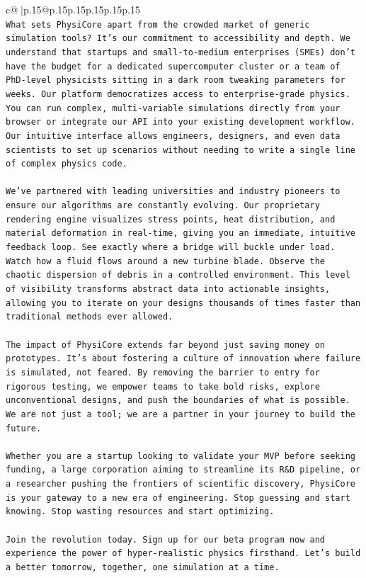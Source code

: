\documentclass{article}
\begin{document}
{\begin{supertabular}{c@{$\;$}|p{.15\linewidth}@{}p{.15\linewidth}p{.15\linewidth}p{.15\linewidth}p{.15\linewidth}p{.15\linewidth}}
{{{\\ 
\texttt{What sets PhysiCore apart from the crowded market of generic simulation tools? It's our commitment to accessibility and depth. We understand that startups and small{-}to{-}medium enterprises (SMEs) don't have the budget for a dedicated supercomputer cluster or a team of PhD{-}level physicists sitting in a dark room tweaking parameters for weeks. Our platform democratizes access to enterprise{-}grade physics. You can run complex, multi{-}variable simulations directly from your browser or integrate our API into your existing development workflow. Our intuitive interface allows engineers, designers, and even data scientists to set up scenarios without needing to write a single line of complex physics code.} \\
\\ 
\texttt{We've partnered with leading universities and industry pioneers to ensure our algorithms are constantly evolving. Our proprietary rendering engine visualizes stress points, heat distribution, and material deformation in real{-}time, giving you an immediate, intuitive feedback loop. See exactly where a bridge will buckle under load. Watch how a fluid flows around a new turbine blade. Observe the chaotic dispersion of debris in a controlled environment. This level of visibility transforms abstract data into actionable insights, allowing you to iterate on your designs thousands of times faster than traditional methods ever allowed.} \\
\\ 
\texttt{The impact of PhysiCore extends far beyond just saving money on prototypes. It's about fostering a culture of innovation where failure is simulated, not feared. By removing the barrier to entry for rigorous testing, we empower teams to take bold risks, explore unconventional designs, and push the boundaries of what is possible. We are not just a tool; we are a partner in your journey to build the future.} \\
\\ 
\texttt{Whether you are a startup looking to validate your MVP before seeking funding, a large corporation aiming to streamline its R\&D pipeline, or a researcher pushing the frontiers of scientific discovery, PhysiCore is your gateway to a new era of engineering. Stop guessing and start knowing. Stop wasting resources and start optimizing.} \\
\\ 
\texttt{Join the revolution today. Sign up for our beta program now and experience the power of hyper{-}realistic physics firsthand. Let's build a better tomorrow, together, one simulation at a time.} \\
}}}
\end{supertabular}}
\end{document}
